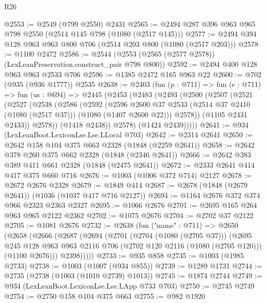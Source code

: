 \begin{lexlean}{R26}
\begin{coremodule}
@2553 := @2549 (@799 @2550) @2431
@2565 := @2494 @287 @396 @963 @965 @798 @2550 (@2514 @145 @798 (@1080 (@2517 @145)))
@2577 := @2494 @394 @128 @963 @963 @800 @706 (@2514 @203 @800 (@1080 (@2517 @203)))
@2578 := @1100 @2472
@2586 := @2544 (@2553 (@2565 (@2577 @2578)) (LexLeanPreservation.construct_pair @798 @800))
@2592 := @2494 @400 @128 @963 @963 @2533 @706
@2596 := @1385 @2472 @165 @963 @22
@2600 := @702 (@935 (@936 @1777)) @2535
@2638 := @2403
    (fun (p : @711) =>
    fun (e : @711) =>
    fun (us : @694) =>
    @2445
      (@2453
        (@2483
          (@2493
            (@2500
              (@2507
                (@2521
                  (@2527
                    (@2538
                      (@2586
                        (@2592
                          (@2596
                            @2600
                            @37
                            @2533
                            (@2514 @37 @2410 (@1080 (@2517 @37)))
                            (@1080 (@1407 @2600 @22)))
                          @2578))
                      (@1105 @2431 @2433))
                    @2578))
                (@1418 @2438))
              @2578)
            (@1424 @2439)))))
@2641 := @934 (LexLeanBoot.LexiconLse.Lse.LLocal @703)
@2642 := @2314 @2641
@2650 := @2642 @158 @104 @375 @663 @2328 (@1848 (@2259 @2641))
@2658 := @2642 @378 @260 @375 @662 @2328 (@1848 (@2346 @2641))
@2666 := @2642 @383 @389 @411 @661 @2328 (@1848 (@2475 @2641))
@2672 := @2333 @2641 @414 @417 @375 @660 @716
@2676 := @1003 (@1006 @372 @714) @2127
@2678 := @2672 @2676 @2328
@2679 := @1849 @414
@2687 := @2678 (@1848 (@2679 @2641)) (@1036 (@1037 @417 @716 @2127))
@2694 := @1164 @2676 @372 @374 @966 @2323 @2363 @2327
@2695 := @1066 @2676
@2701 := @2695 @165 @264 @963 @965 @2122 @2362
@2702 := @1075 @2676
@2704 := @2702 @37 @2122
@2705 := @1081 @2676
@2732 := @2638
    (fun ("name" : @711) =>
    @2650
      (@2658
        (@2666
          (@2687
            (@2694
              (@2701
                (@2704 (@1080 (@2705 @37)))
                (@2695
                  @245
                  @128
                  @963
                  @963
                  @2116
                  @706
                  (@2702 @120 @2116 (@1080 (@2705 @120)))
                  (@1100 @2676)))
              @2398)))))
@2733 := @935 @858
@2735 := @1003 (@1985 @2733)
@2738 := @1003 (@1007 (@934 @855))
@2739 := @1289 @1731
@2744 := @2735 (@2738 (@1003 (@1010 @2739) @1013))
@2745 := @1874 @2744
@2749 := @934 (LexLeanBoot.LexiconLse.Lse.LApp @733 @703)
@2750 := @2745 @2749
@2754 := @2750 @158 @104 @375 @663
@2755 := @982 @1920

\end{coremodule}
\end{lexlean}
